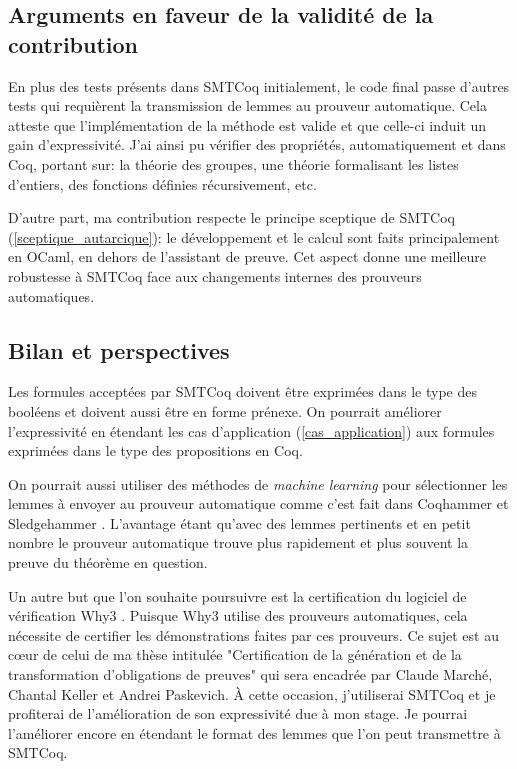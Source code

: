 \documentclass[11pt]{article}
\begin{document}
\subsection{Arguments en faveur de la validité de la contribution}

En plus des tests présents dans SMTCoq initialement, le code final passe d'autres tests qui requièrent la transmission de lemmes au prouveur automatique. Cela atteste  que l'implémentation de la méthode est valide et que celle-ci induit un gain d'expressivité. J'ai ainsi pu vérifier des propriétés, automatiquement et dans Coq, portant sur: la théorie des groupes, une théorie formalisant les listes d'entiers, des fonctions définies récursivement, etc.

D'autre part, ma contribution respecte le principe sceptique de SMTCoq (\ref{sceptique_autarcique}): le développement et le calcul sont faits principalement en OCaml, en dehors de l'assistant de preuve. Cet aspect donne une meilleure robustesse à SMTCoq face aux changements internes des prouveurs automatiques.


\subsection{Bilan et perspectives}\label{persp}

Les formules acceptées par SMTCoq doivent être exprimées dans le type des booléens et doivent aussi être en forme prénexe. On pourrait améliorer l'expressivité en étendant les cas d'application (\ref{cas_application}) aux formules exprimées dans le type des propositions en Coq.

On pourrait aussi utiliser des méthodes de \textit{machine learning} pour sélectionner les lemmes à envoyer au prouveur automatique comme c'est fait dans Coqhammer et Sledgehammer \cite{hol_selector, coqhammer}. L'avantage étant qu'avec des lemmes pertinents et en petit nombre le prouveur automatique trouve plus rapidement et plus souvent la preuve du théorème en question.

Un autre but que l'on souhaite poursuivre est la certification du logiciel de vérification Why3 \cite{why3_intro}. Puisque Why3 utilise des prouveurs automatiques, cela nécessite de certifier les démonstrations faites par ces prouveurs. Ce sujet est au c\oe ur de celui de ma thèse intitulée "Certification de la génération et de la transformation d'obligations de preuves" qui sera encadrée par Claude Marché, Chantal Keller et Andrei Paskevich. À cette occasion, j'utiliserai SMTCoq et je profiterai de l'amélioration de son expressivité due à mon stage. Je pourrai l'améliorer encore en étendant le format des lemmes que l'on peut transmettre à SMTCoq. \medbreak
\end{document}

